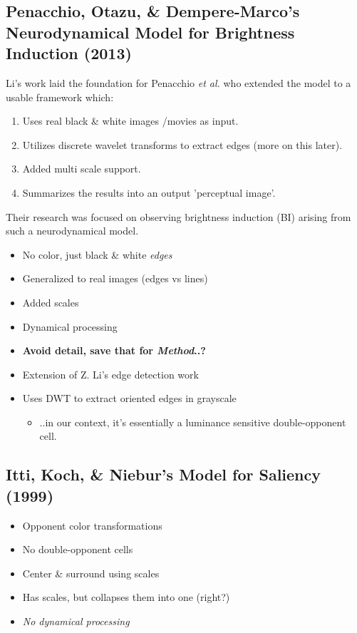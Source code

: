 \documentclass[journal,onecolumn]{IEEEtran}
\begin{document}
\subsection*{Penacchio, Otazu, \& Dempere-Marco's Neurodynamical Model for Brightness Induction (2013)}
Li's work laid the foundation for Penacchio \textit{et al.} who extended the model to a usable framework which:
\begin{enumerate}
    \item Uses real black \& white images /movies as input.
    \item Utilizes discrete wavelet transforms to extract edges (more on this later).
    \item Added multi scale support.
    \item Summarizes the results into an output 'perceptual image'.
\end{enumerate}
Their research was focused on observing brightness induction (BI) arising from such a neurodynamical model.
\begin{itemize}
    \item No color, just black \& white \textit{edges}
    \item Generalized to real images (edges vs lines)
    \item Added scales
    \item Dynamical processing
    \item \textbf{Avoid detail, save that for \textit{Method}..?}
    \item Extension of Z. Li's edge detection work
    \item Uses DWT to extract oriented edges in grayscale
    \begin{itemize}
        \item ..in our context, it's essentially a luminance sensitive double-opponent cell.
    \end{itemize}
\end{itemize}


\subsection*{Itti, Koch, \& Niebur's Model for Saliency (1999)}
\begin{itemize}
    \item Opponent color transformations
    \item No double-opponent cells
    \item Center \& surround using scales
    \item Has scales, but collapses them into one (right?)
    \item \textit{No dynamical processing}
\end{itemize}
\end{document}
